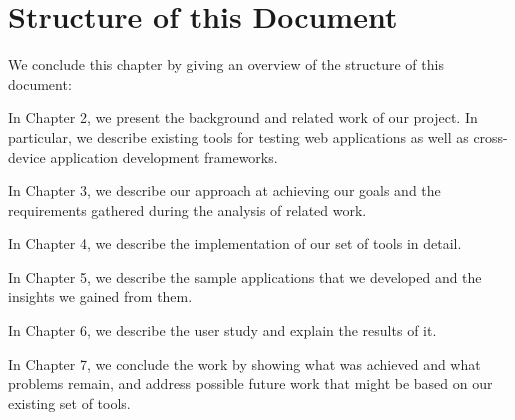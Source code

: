 \section{Structure of this Document}

We conclude this chapter by giving an overview of the structure of this document:

In Chapter 2, we present the background and related work of our project. In particular, we describe existing tools for testing web applications as well as cross-device application development frameworks.

In Chapter 3, we describe our approach at achieving our goals and the requirements gathered during the analysis of related work.

In Chapter 4, we describe the implementation of our set of tools in detail.

In Chapter 5, we describe the sample applications that we developed and the insights we gained from them.

In Chapter 6, we describe the user study and explain the results of it.

In Chapter 7, we conclude the work by showing what was achieved and what problems remain, and address possible future work that might be based on our existing set of tools.